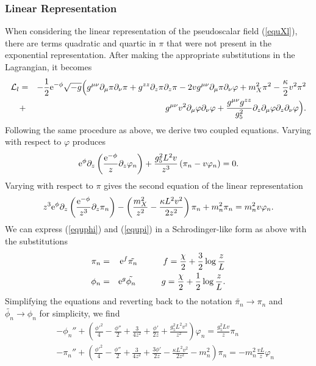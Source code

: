 \subsubsection{Linear Representation}

When considering the linear representation of the pseudoscalar field (\ref{equXl}), there are terms quadratic and quartic in $\pi$ that were not present in the exponential representation. 
After making the appropriate substitutions in the Lagrangian, it becomes 
\begin{eqnarray}
\mathcal{L}_{l} & = & -\frac{1}{2}{\rm e}^{-\phi}\sqrt{-g}\Big(g^{\mu\nu}\partial_{\mu}\pi\partial_{\nu}\pi+g^{zz}\partial_{z}\pi\partial_{z}\pi-2vg^{\mu\nu}\partial_{\mu}\pi\partial_{\nu}\varphi+m_{X}^{2}\pi^{2}-\frac{\kappa}{2}v^{2}\pi^{2}\nonumber \\
 & + & g^{\mu\nu}v^{2}\partial_{\mu}\varphi\partial_{\nu}\varphi+\frac{g^{\mu\nu}g^{zz}}{g_{5}^{2}}\partial_{z}\partial_{\mu}\varphi\partial_{z}\partial_{\nu}\varphi\Big).
\end{eqnarray}
Following the same procedure as above, we derive two coupled equations.
Varying with respect to $\varphi$ produces 
\begin{equation}
{\rm e}^{\phi}\partial_{z}\left(\frac{{\rm e}^{-\phi}}{z}\partial_{z}\varphi_{n}\right)+\frac{g_{5}^{2}L^{2}v}{z^{3}}\left(\pi_{n}-v\varphi_{n}\right)=0.\label{equphi}
\end{equation}
Varying with respect to $\pi$ gives the second equation of the linear representation 
\begin{equation}
z^{3}{\rm e}^{\phi}\partial_{z}\left(\frac{{\rm e}^{-\phi}}{z^{3}}\partial_{z}\pi_{n}\right)-\left(\frac{m_{X}^{2}}{z^{2}}-\frac{\kappa L^{2}v^{2}}{2z^{2}}\right)\pi_{n}+m_{n}^{2}\pi_{n}=m_{n}^{2}v\varphi_{n}.\label{equpi}
\end{equation}
 We can express (\ref{equphi}) and (\ref{equpi}) in a Schrodinger-like form as above %
with the substitutions 
\begin{eqnarray}
\pi_{n} & = & {\rm e}^{f}\tilde{\pi_{n}}\quad\quad\quad f=\frac{\chi}{2}+\frac{3}{2}\log{\frac{z}{L}}\\
\phi_{n} & = & {\rm e}^{g}\tilde{\phi_{n}}\quad\quad\quad g=\frac{\chi}{2}+\frac{1}{2}\log{\frac{z}{L}}.
\end{eqnarray}
Simplifying the equations and reverting back to the notation $\tilde{\pi_{n}}\rightarrow\pi_{n}$ and $\tilde{\phi_{n}}\rightarrow\phi_{n}$ for simplicity, we find  
\begin{eqnarray}
 &  & -\phi_{n}''+\left(\frac{\phi'^{2}}{4}-\frac{\phi''}{2}+\frac{3}{4z^{2}}+\frac{\phi'}{2z}+\frac{g_{5}^{2}L^{2}v^{2}}{z^{2}}\right)\varphi_{n}=\frac{g_{5}^{2}Lv}{z}\pi_{n}\label{equSchphi}\\
 &  & -\pi_{n}''+\left(\frac{\phi'^{2}}{4}-\frac{\phi''}{2}+\frac{3}{4z^{2}}+\frac{3\phi'}{2z}-\frac{\kappa L^{2}v^{2}}{2z^{2}}-m_{n}^{2}\right)\pi_{n}=-m_{n}^{2}\frac{vL}{z}\varphi_{n}\label{equSchpi}
\end{eqnarray}

